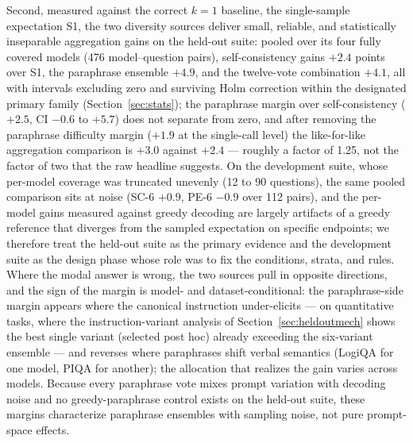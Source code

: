 Second, measured against the correct $k{=}1$ baseline, the single-sample expectation S1, the two diversity sources deliver small, reliable, and statistically inseparable aggregation gains on the held-out suite: pooled over its four fully covered models (476 model--question pairs), self-consistency gains $+2.4$ points over S1, the paraphrase ensemble $+4.9$, and the twelve-vote combination $+4.1$, all with intervals excluding zero and surviving Holm correction within the designated primary family (Section~\ref{sec:stats}); the paraphrase margin over self-consistency ($+2.5$, CI $-0.6$ to $+5.7$) does not separate from zero, and after removing the paraphrase difficulty margin ($+1.9$ at the single-call level) the like-for-like aggregation comparison is $+3.0$ against $+2.4$ --- roughly a factor of 1.25, not the factor of two that the raw headline suggests. On the development suite, whose per-model coverage was truncated unevenly (12 to 90 questions), the same pooled comparison sits at noise (SC-6 $+0.9$, PE-6 $-0.9$ over 112 pairs), and the per-model gains measured against greedy decoding are largely artifacts of a greedy reference that diverges from the sampled expectation on specific endpoints; we therefore treat the held-out suite as the primary evidence and the development suite as the design phase whose role was to fix the conditions, strata, and rules. Where the modal answer is wrong, the two sources pull in opposite directions, and the sign of the margin is model- and dataset-conditional: the paraphrase-side margin appears where the canonical instruction under-elicits --- on quantitative tasks, where the instruction-variant analysis of Section~\ref{sec:heldoutmech} shows the best single variant (selected post hoc) already exceeding the six-variant ensemble --- and reverses where paraphrases shift verbal semantics (LogiQA for one model, PIQA for another); the allocation that realizes the gain varies across models. Because every paraphrase vote mixes prompt variation with decoding noise and no greedy-paraphrase control exists on the held-out suite, these margins characterize paraphrase ensembles with sampling noise, not pure prompt-space effects.

